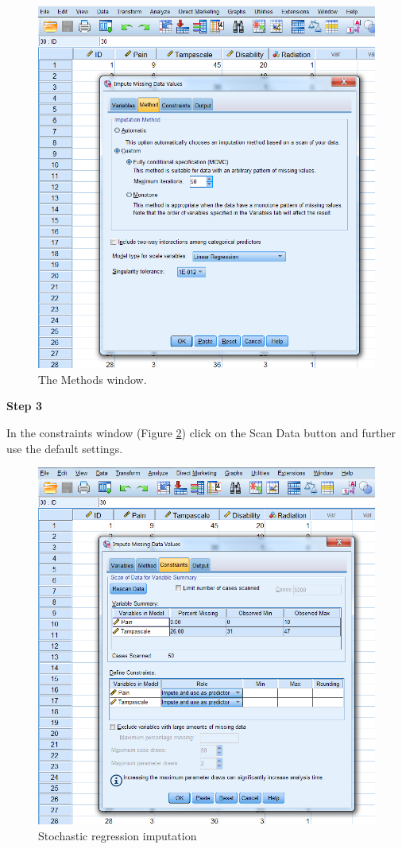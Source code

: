 \documentclass[]{book}
\theoremstyle{definition}
\theoremstyle{definition}
\theoremstyle{definition}
\theoremstyle{remark}
\begin{document}
\begin{figure}

{\centering \includegraphics[width=0.7\linewidth]{images/fig3.19} 

}

\caption{The Methods window.}\label{fig:fig3-19}
\end{figure}

\textbf{Step 3}

In the constraints window (Figure \ref{fig:fig3-20}) click on the Scan
Data button and further use the default settings.

\begin{figure}

{\centering \includegraphics[width=0.7\linewidth]{images/fig3.20} 

}

\caption{Stochastic regression imputation}\label{fig:fig3-20}
\end{figure}
\end{document}
